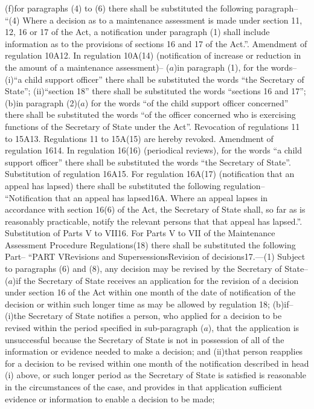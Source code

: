 \documentclass[12pt,a4paper]{article}
\begin{document}
(f)for paragraphs (4) to (6) there shall be substituted the following paragraph–
“(4) Where a decision as to a maintenance assessment is made under section 11, 12, 16 or 17 of the Act, a notification under paragraph (1) shall include information as to the provisions of sections 16 and 17 of the Act.”.
Amendment of regulation 10A12.  In regulation 10A(14) (notification of increase or reduction in the amount of a maintenance assessment)–
($a$)in paragraph (1), for the words–
(i)“a child support officer” there shall be substituted the words “the Secretary of State”;
(ii)“section 18” there shall be substituted the words “sections 16 and 17”;
(b)in paragraph (2)($a$) for the words “of the child support officer concerned” there shall be substituted the words “of the officer concerned who is exercising functions of the Secretary of State under the Act”.
Revocation of regulations 11 to 15A13.  Regulations 11 to 15A(15) are hereby revoked.
Amendment of regulation 1614.  In regulation 16(16) (periodical reviews), for the words “a child support officer” there shall be substituted the words “the Secretary of State”.
Substitution of regulation 16A15.  For regulation 16A(17) (notification that an appeal has lapsed) there shall be substituted the following regulation–
“Notification that an appeal has lapsed16A.  Where an appeal lapses in accordance with section 16(6) of the Act, the Secretary of State shall, so far as is reasonably practicable, notify the relevant persons that that appeal has lapsed.”.
Substitution of Parts V to VII16.  For Parts V to VII of the Maintenance Assessment Procedure Regulations(18) there shall be substituted the following Part–
“PART VRevisions and SupersessionsRevision of decisions17.—(1) Subject to paragraphs (6) and (8), any decision may be revised by the Secretary of State–
($a$)if the Secretary of State receives an application for the revision of a decision under section 16 of the Act within one month of the date of notification of the decision or within such longer time as may be allowed by regulation 18;
(b)if–
(i)the Secretary of State notifies a person, who applied for a decision to be revised within the period specified in sub-paragraph ($a$), that the application is unsuccessful because the Secretary of State is not in possession of all of the information or evidence needed to make a decision; and
(ii)that person reapplies for a decision to be revised within one month of the notification described in head (i) above, or such longer period as the Secretary of State is satisfied is reasonable in the circumstances of the case, and provides in that application sufficient evidence or information to enable a decision to be made;
\end{document}
